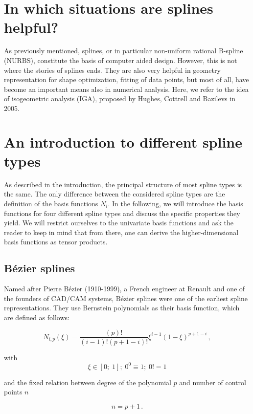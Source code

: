 \documentclass[11pt,a4paper]{article}
\begin{document}
\section{In which situations are splines helpful?}

As previously mentioned, splines, or in particular non-uniform rational B-spline (NURBS), constitute the basis of computer aided design. However, this is not where the stories of splines ends. They are also very helpful in geometry representation for shape optimization, fitting of data points, but most of all, have become an important means also in numerical analysis. Here, we refer to the idea of isogeometric analysis (IGA), proposed by Hughes, Cottrell and Bazilevs in 2005.

\section{An introduction to different spline types}

As described in the introduction, the principal structure of most spline types is the same. The only difference between the considered spline types are the definition of the basis functions $N_i$. In the following, we will introduce the basis functions for four different spline types and discuss the specific properties they yield. We will restrict ourselves to the univariate basis functions and ask the reader to keep in mind that from there, one can derive the higher-dimensional basis functions as tensor products.

\subsection{Bézier splines}

Named after Pierre Bézier (1910-1999), a French engineer at Renault and one of the founders of CAD/CAM systems, Bézier splines were one of the earliest spline representations. They use Bernstein polynomials as their basis function, which are defined as follows:

\begin{equation}
N_{i,p}(\xi)=\frac{(p)!}{(i-1)!(p+1-i)!}\xi^{i-1}(1-\xi)^{p+1-i} \,,
\end{equation}

with
	\[\xi\in[0;\;1];\; 0^{0}\equiv 1;\; 0!=1\]

and the fixed relation between degree of the polynomial $p$ and number of control points $n$

	\[n=p+1 \,.\]
\end{document}

